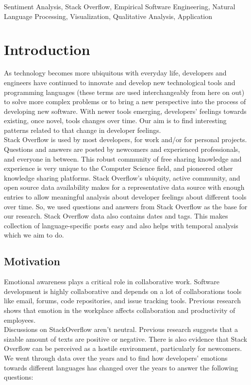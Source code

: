 \documentclass[conference]{IEEEtran}
\begin{document}
\begin{IEEEkeywords}
Sentiment Analysis, Stack Overflow, Empirical Software Engineering, Natural Language Processing, Visualization, Qualitative Analysis, Application
\end{IEEEkeywords}

\section{Introduction}
As technology becomes more ubiquitous with everyday life, developers and engineers have continued to innovate and develop new technological tools and programming languages (these terms are used interchangeably from here on out) to solve more complex problems or to bring a new perspective into the process of developing new software. With newer tools emerging, developers' feelings towards existing, once novel, tools changes over time. Our aim is to find interesting patterns related to that change in developer feelings. \\

Stack Overflow is used by most developers, for work and/or for personal projects. Questions and answers are posted by newcomers and experienced professionals, and everyone in between. This robust community of free sharing knowledge and experience is very unique to the Computer Science field, and pioneered other knowledge sharing platforms. Stack Overflow's ubiquity, active community, and open source data availability makes for a representative data source with enough entries to allow meaningful analysis about developer feelings about different tools over time. So, we used questions and answers from Stack Overflow as the base for our research. Stack Overflow data also contains dates and tags. This makes collection of language-specific posts easy and also helps with temporal analysis which we aim to do.

\subsection{Motivation}
Emotional awareness plays a critical role in collaborative work. Software development is highly collaborative and depends on a lot of collaborations tools like email, forums, code repositories, and issue tracking tools\cite{b1}. Previous research shows that emotion in the workplace affects collaboration and productivity of employees\cite{b2}. \\

Discussions on StackOverflow aren't neutral. Previous research suggests that a sizable amount of texts are positive or negative\cite{b3, b4, b5}. There is also evidence that Stack Overflow can be perceived as a hostile environment, particularly for newcomers\cite{b6}. We went through data over the years and to find how developers' emotions towards different languages has changed over the years to answer the following questions:
\end{document}
